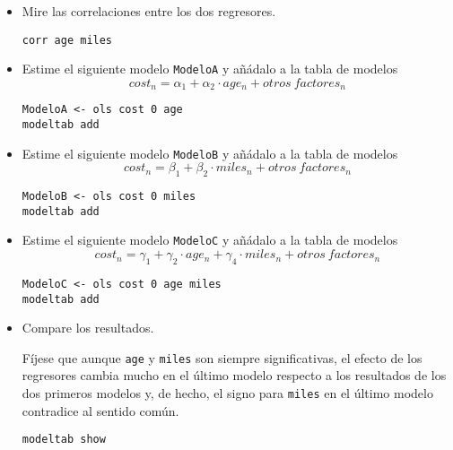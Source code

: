 \documentclass[11pt]{article}
\begin{document}
\begin{itemize}
\item Mire las correlaciones entre los dos regresores.
{\vspace{0pt} \color{gray!70!black}
\begin{verbatim}
corr age miles
\end{verbatim}
}

\item Estime el siguiente modelo \texttt{ModeloA} y añádalo a la tabla de
modelos
\begin{displaymath}
  cost_{n} = \alpha_1 + \alpha_2\cdot age_n +  otros\ factores_n
\end{displaymath}
{\vspace{0pt} \color{gray!70!black}
\begin{verbatim}
ModeloA <- ols cost 0 age
modeltab add
\end{verbatim}
}

\item Estime el siguiente modelo \texttt{ModeloB} y añádalo a la tabla de modelos
\begin{displaymath}
  cost_{n} = \beta_1 +  \beta_2 \cdot miles_n + otros\ factores_n
\end{displaymath}
{\vspace{0pt} \color{gray!70!black}
\begin{verbatim}
ModeloB <- ols cost 0 miles
modeltab add
\end{verbatim}
}

\item Estime el siguiente modelo \texttt{ModeloC} y añádalo a la tabla de modelos
\begin{displaymath}
  cost_{n} = \gamma_1 + \gamma_2\cdot age_n + \gamma_4 \cdot miles_n + otros\ factores_n
\end{displaymath}
{\vspace{0pt} \color{gray!70!black}
\begin{verbatim}
ModeloC <- ols cost 0 age miles
modeltab add
\end{verbatim}
}

\item Compare los resultados.

Fíjese que aunque \texttt{age} y \texttt{miles} son siempre significativas, el
efecto de los regresores cambia mucho en el último modelo respecto a
los resultados de los dos primeros modelos y, de hecho, el signo
para \texttt{miles} en el último modelo contradice al sentido común.
{\vspace{0pt} \color{gray!70!black}
\begin{verbatim}
modeltab show
\end{verbatim}
}


\end{itemize}
\end{document}
